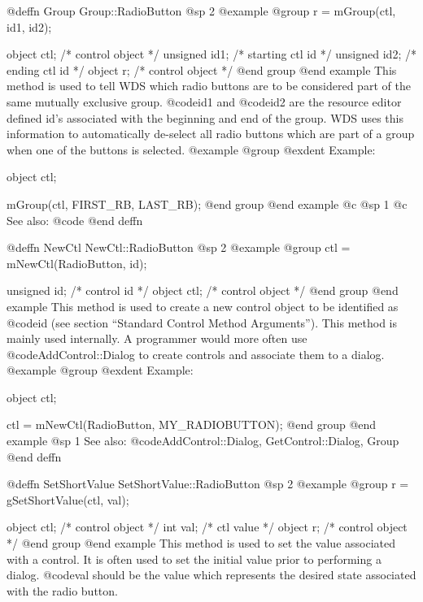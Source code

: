 @deffn {Group} Group::RadioButton
@sp 2
@example
@group
r = mGroup(ctl, id1, id2);

object  ctl;    /*  control object   */
unsigned id1;   /*  starting ctl id  */
unsigned id2;   /*  ending ctl id    */
object  r;      /*  control object   */
@end group
@end example
This method is used to tell WDS which radio buttons are to be considered
part of the same mutually exclusive group.  @code{id1} and @code{id2}
are the resource editor defined id's associated with the beginning and
end of the group.  WDS uses this information to automatically de-select
all radio buttons which are part of a group when one of the buttons is
selected.
@example
@group
@exdent Example:

object  ctl;

mGroup(ctl, FIRST_RB, LAST_RB);
@end group
@end example
@c @sp 1
@c See also:  @code{}
@end deffn











@deffn {NewCtl} NewCtl::RadioButton
@sp 2
@example
@group
ctl = mNewCtl(RadioButton, id);

unsigned  id;   /*  control id      */
object   ctl;   /*  control object  */
@end group
@end example
This method is used to create a new control object to be identified as
@code{id} (see section ``Standard Control Method Arguments'').  This
method is mainly used internally.  A programmer would more often
use @code{AddControl::Dialog} to create controls and associate them
to a dialog.
@example
@group
@exdent Example:

object  ctl;

ctl = mNewCtl(RadioButton, MY_RADIOBUTTON);
@end group
@end example
@sp 1
See also:  @code{AddControl::Dialog, GetControl::Dialog, Group}
@end deffn







@deffn {SetShortValue} SetShortValue::RadioButton
@sp 2
@example
@group
r = gSetShortValue(ctl, val);

object  ctl;    /*  control object  */
int     val;    /*  ctl value       */
object  r;      /*  control object  */
@end group
@end example
This method is used to set the value associated with a control.  It is
often used to set the initial value prior to performing a dialog.
@code{val} should be the value which represents the desired state associated
with the radio button.

